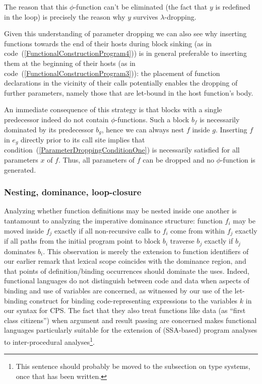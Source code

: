 The reason that this $\phi$-function can't be eliminated (the fact
that $y$ is redefined in the loop) is precisely the reason why $y$
survives $\lambda$-dropping.

Given this understanding of parameter dropping we can also see why
inserting functions towards the end of their hosts during block
sinking (as in code~(\ref{FunctionalConstructionProgram4})) is in
general preferable to inserting them at the beginning of their hosts
(as in code~(\ref{FunctionalConstructionProgram3})): the placement of
function declarations in the vicinity of their calls potentially
enables the dropping of further parameters, namely those that are
let-bound in the host function's body.

An immediate consequence of this strategy is that blocks with a single
predecessor indeed do not contain $\phi$-functions. Such a block $b_f$
is necessarily dominated by its predecessor $b_g$, hence we can always
nest $f$ inside $g$. Inserting $f$ in $e_g$ directly prior to its call
site implies that condition~(\ref{ParameterDroppingConditionOne}) is
necessarily satisfied for all parameters $x$ of $f$. Thus, all
parameters of $f$ can be dropped and no $\phi$-function is generated.

\subsubsection{Nesting, dominance, loop-closure}
\label{section:semantics:loopclosure}
Analyzing whether function definitions may be nested inside one
another is tantamount to analyzing the imperative dominance structure:
function $f_i$ may be moved inside $f_j$ exactly if all non-recursive
calls to $f_i$ come from within $f_j$ exactly if all paths from the
initial program point to block $b_i$ traverse $b_j$ exactly if $b_j$
dominates $b_i$.  This observation is merely the extension to function
identifiers of our earlier remark that lexical scope coincides with
the dominance region, and that points of definition/binding
occurrences should dominate the uses. Indeed, functional languages do
not distinguish between code and data when aspects of binding and use
of variables are concerned, as witnessed by our use of the let-binding
construct for binding code-representing expressions to the variables
$k$ in our syntax for CPS. The fact that they also treat functions
like data (as ``first class citizens'') when argument and result
passing are concerned makes functional languages particularly suitable
for the extension of (SSA-based) program analyses to inter-procedural
analyses\footnote{This sentence should probably be moved to the
subsection on type systems, once that has been written.}.

